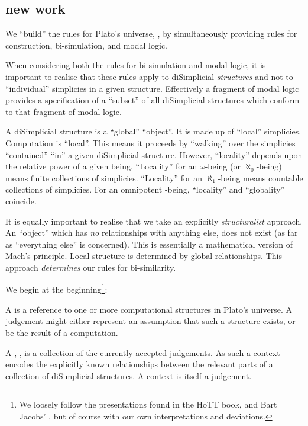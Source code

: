 \documentclass[a4paper,openany]{amsbook}
\begin{document}
\subsection{new work}

We ``build'' the rules for Plato's universe, \Universe{}{}, by simultaneously providing rules
for construction, bi-simulation, and modal logic.

When considering both the rules for bi-simulation and modal logic, it is important to
realise that these rules apply to diSimplicial \emph{structures} and not to ``individual''
simplicies in a given structure. Effectively a fragment of modal logic provides a
specification of a ``subset'' of all diSimplicial structures which conform to that
fragment of modal logic.

A diSimplicial structure is a ``global'' ``object''.  It is made up of ``local'' simplicies. 
Computation is ``local''. This means it proceeds by ``walking'' over the simplicies 
``contained'' ``in'' a given diSimplicial structure. However, ``locality'' depends upon the 
relative power of a given being. ``Locality'' for an $\omega$-being (or $\aleph_0$-being) 
means finite collections of simplicies. ``Locality'' for an $\aleph_1$-being means countable 
collections of simplicies. For an omnipotent \Cardinal-being, ``locality'' and ``globality'' 
coincide.

It is equally important to realise that we take an explicitly \emph{structuralist}
approach. An ``object'' which has \emph{no} relationships with anything else, does not
exist (as far as ``everything else'' is concerned). This is essentially a mathematical 
version of Mach's principle. Local structure is determined by global relationships.  This 
approach \emph{determines} our rules for bi-similarity.

We begin at the beginning\footnote{We loosely follow the presentations found in the HoTT
book, \cite[Appendix A2]{ufp2013hott} and Bart Jacobs' \cite{jacobs1999catLogicTypeTh},
but of course with our own interpretations and deviations.}:

A  is a reference to one or more computational structures in Plato's
universe. A judgement might either represent an assumption that such a structure exists,
or be the result of a computation.

A , \cJudgement{\Gamma}, is a collection of the currently accepted
judgements. As such a context encodes the explicitly known relationships between the
relevant parts of a collection of diSimplicial structures. A context is itself a
judgement.
\end{document}
